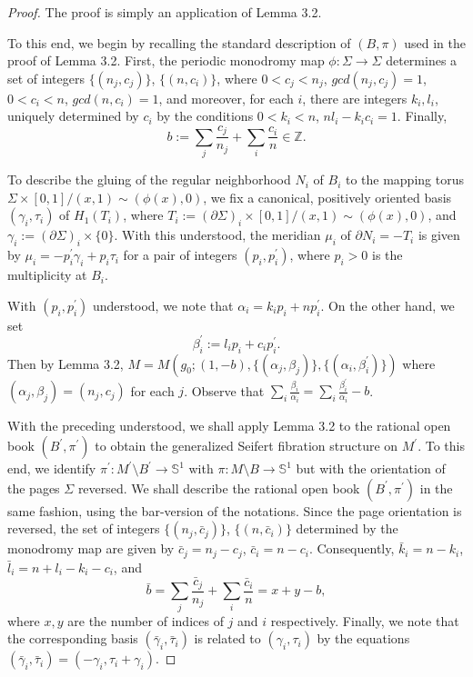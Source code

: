 \documentclass[11pt]{amsart}
\theoremstyle{plain}
\numberwithin{theorem}{section}
\theoremstyle{definition}
\newcommand{\Z}{{\mathbb Z}}
\newcommand{\s}{{\mathbb S}}
\begin{document}
\begin{proof}
The proof is simply an application of Lemma 3.2.

To this end, we begin by recalling the standard description of $(B,\pi)$ used in the proof of Lemma 3.2. First, the periodic monodromy map $\phi: \Sigma\rightarrow \Sigma$ determines a
set of integers $\{(n_j,c_j)\}$, $\{(n,c_i)\}$, where $0<c_j<n_j$, $gcd(n_j,c_j)=1$, 
$0<c_i<n$, $gcd(n,c_i)=1$, and moreover, for each $i$, there are integers $k_i,l_i$, uniquely determined by $c_i$ by the conditions $0<k_i<n$, $nl_i-k_ic_i=1$. Finally, 
$$b:=\sum_j\frac{c_j}{n_j}+\sum_i\frac{c_i}{n}\in\Z.$$

To describe the gluing of the regular neighborhood $N_i$ of $B_i$ to the mapping torus 
$\Sigma\times [0,1]/ (x,1)\sim (\phi(x),0)$, we fix a canonical, positively oriented basis 
$(\gamma_i,\tau_i)$ of $H_1(T_i)$, where $T_i:=(\partial \Sigma)_i \times [0,1]/ (x,1)\sim (\phi(x),0)$,
and $\gamma_i:=(\partial \Sigma)_i \times \{0\}$. With this understood, the meridian $\mu_i$ of
$\partial N_i=-T_i$ is given by $\mu_i=-p_i^\prime\gamma_i +p_i\tau_i$ for a pair of integers 
$(p_i,p_i^\prime)$, where $p_i>0$ is the multiplicity at $B_i$.

With $(p_i,p_i^\prime)$ understood, we note that $\alpha_i=k_ip_i+np_i^\prime$. On the other hand,
we set 
$$
\beta_i^\prime:=l_ip_i+c_ip_i^\prime.
$$
Then by Lemma 3.2, $M=M(g_0; (1,-b), \{(\alpha_j,\beta_j)\}, \{(\alpha_i,\beta_i^\prime)\})$
where $(\alpha_j,\beta_j)=(n_j,c_j)$ for each $j$.  Observe that $\sum_i\frac{\beta_i}{\alpha_i}=\sum_i\frac{\beta_i^\prime}{\alpha_i}-b$.

With the preceding understood, we shall apply Lemma 3.2 to the rational open book 
$(B^\prime,\pi^\prime)$ to obtain the generalized Seifert fibration structure on $M^\prime$. To this end,
we identify $\pi^\prime: M^\prime\setminus B^\prime \rightarrow \s^1$ with $\pi: M\setminus B \rightarrow \s^1$ but with the orientation of the pages $\Sigma$ reversed. We shall describe the rational open book $(B^\prime,\pi^\prime)$ in the same fashion, using the bar-version of the notations. Since the page orientation is reversed, the set of integers $\{(n_j, \bar{c}_j)\}$, $\{(n,\bar{c}_i)\}$ determined by the monodromy map are given by $\bar{c}_j=n_j-c_j$, $\bar{c}_i=n-c_i$. 
Consequently, $\bar{k}_i=n-k_i$, $\bar{l}_i=n+l_i-k_i-c_i$, and 
$$
\bar{b}=\sum_j\frac{\bar{c}_j}{n_j}+\sum_i\frac{\bar{c}_i}{n}=x+y-b,
$$
where $x,y$ are the number of indices of $j$ and $i$ respectively. Finally, we note that the corresponding basis $(\bar{\gamma}_i,\bar{\tau}_i)$ is related to $(\gamma_i,\tau_i)$ by the 
equations $(\bar{\gamma}_i,\bar{\tau}_i)=(-\gamma_i, \tau_i+\gamma_i)$. 


\end{proof}
\end{document}
